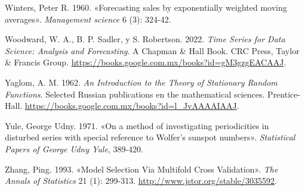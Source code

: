 \documentclass[
  us-letterpaper,
]{scrreprt}
\newlength{\cslhangindent}
\newenvironment{CSLReferences}[2] %
 {\begin{list}{}{%
  \setlength{\itemindent}{0pt}
  \setlength{\leftmargin}{0pt}
  \setlength{\parsep}{0pt}
  \ifodd #1
   \setlength{\leftmargin}{\cslhangindent}
   \setlength{\itemindent}{-1\cslhangindent}
  \fi
  \setlength{\itemsep}{#2\baselineskip}}}
 {\end{list}}
\theoremstyle{plain}
\theoremstyle{definition}
\theoremstyle{definition}
\theoremstyle{plain}
\theoremstyle{remark}
\begin{document}
\begin{CSLReferences}{1}{0}
Winters, Peter R. 1960. {«Forecasting sales by exponentially weighted
moving averages»}. \emph{Management science} 6 (3): 324-42.

Woodward, W. A., B. P. Sadler, y S. Robertson. 2022. \emph{Time Series
for Data Science: Analysis and Forecasting}. A Chapman \& Hall Book. CRC
Press, Taylor \& Francis Group.
\url{https://books.google.com.mx/books?id=gM3gzgEACAAJ}.

Yaglom, A. M. 1962. \emph{An Introduction to the Theory of Stationary
Random Functions}. Selected Russian publications en the mathematical
sciences. Prentice-Hall.
\url{https://books.google.com.mx/books?id=l_JvAAAAIAAJ}.

Yule, George Udny. 1971. {«On a method of investigating periodicities in
disturbed series with special reference to Wolfer's sunspot numbers»}.
\emph{Statistical Papers of George Udny Yule}, 389-420.

Zhang, Ping. 1993. {«Model Selection Via Multifold Cross Validation»}.
\emph{The Annals of Statistics} 21 (1): 299-313.
\url{http://www.jstor.org/stable/3035592}.

\end{CSLReferences}
\end{document}
